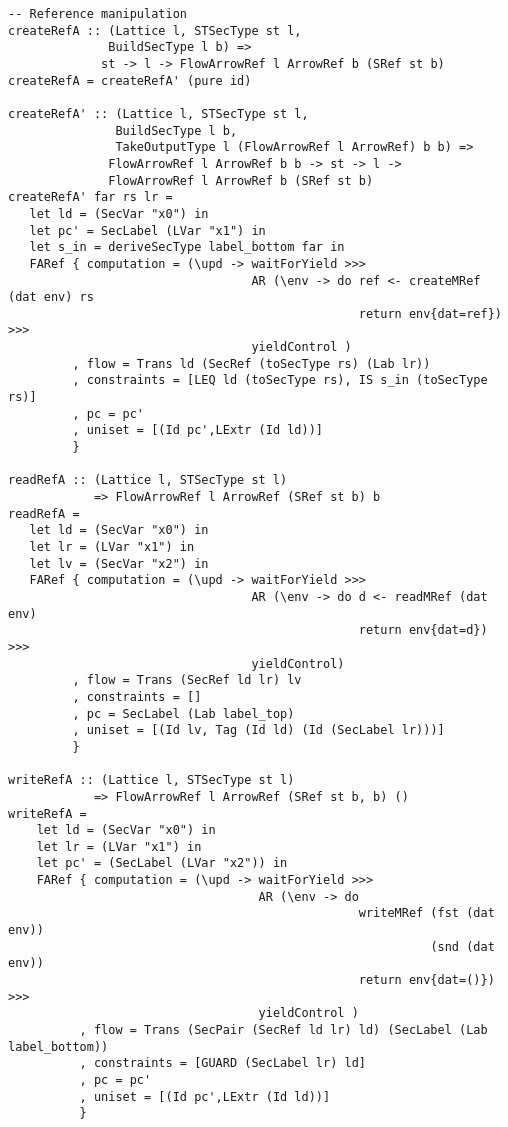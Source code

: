\begin{Verbatim}[fontsize=\footnotesize,frame=lines,
                 framesep=5mm, label={[FlowArrowRef.hs]FlowArrowRef.hs}]
-- Reference manipulation
createRefA :: (Lattice l, STSecType st l,
              BuildSecType l b) =>
             st -> l -> FlowArrowRef l ArrowRef b (SRef st b)
createRefA = createRefA' (pure id)

createRefA' :: (Lattice l, STSecType st l, 
               BuildSecType l b,
               TakeOutputType l (FlowArrowRef l ArrowRef) b b) => 
              FlowArrowRef l ArrowRef b b -> st -> l -> 
              FlowArrowRef l ArrowRef b (SRef st b) 
createRefA' far rs lr = 
   let ld = (SecVar "x0") in
   let pc' = SecLabel (LVar "x1") in
   let s_in = deriveSecType label_bottom far in
   FARef { computation = (\upd -> waitForYield >>>
                                  AR (\env -> do ref <- createMRef (dat env) rs
                                                 return env{dat=ref}) >>>
                                  yieldControl )
         , flow = Trans ld (SecRef (toSecType rs) (Lab lr))
         , constraints = [LEQ ld (toSecType rs), IS s_in (toSecType rs)]  
         , pc = pc'
         , uniset = [(Id pc',LExtr (Id ld))]
         }

readRefA :: (Lattice l, STSecType st l)
            => FlowArrowRef l ArrowRef (SRef st b) b
readRefA =
   let ld = (SecVar "x0") in
   let lr = (LVar "x1") in
   let lv = (SecVar "x2") in
   FARef { computation = (\upd -> waitForYield >>>
                                  AR (\env -> do d <- readMRef (dat env)
                                                 return env{dat=d}) >>>
                                  yieldControl)
         , flow = Trans (SecRef ld lr) lv
         , constraints = []
         , pc = SecLabel (Lab label_top)
         , uniset = [(Id lv, Tag (Id ld) (Id (SecLabel lr)))]
         }

writeRefA :: (Lattice l, STSecType st l) 
            => FlowArrowRef l ArrowRef (SRef st b, b) ()
writeRefA =
    let ld = (SecVar "x0") in
    let lr = (LVar "x1") in
    let pc' = (SecLabel (LVar "x2")) in
	FARef { computation = (\upd -> waitForYield >>>
                                   AR (\env -> do 
                                                 writeMRef (fst (dat env)) 
                                                           (snd (dat env))
                                                 return env{dat=()}) >>>
                                   yieldControl )
          , flow = Trans (SecPair (SecRef ld lr) ld) (SecLabel (Lab label_bottom))
          , constraints = [GUARD (SecLabel lr) ld]
          , pc = pc'
          , uniset = [(Id pc',LExtr (Id ld))]
          }


\end{Verbatim}
